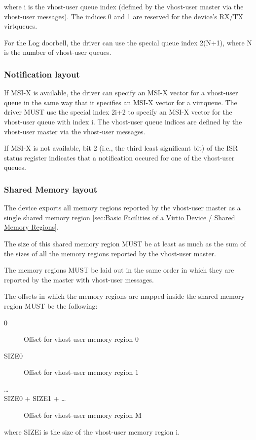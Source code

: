 where i is the vhost-user queue index (defined by the vhost-user master via the
vhost-user messages). The indices 0 and 1 are reserved for the device's RX/TX
virtqueues.

For the Log doorbell, the driver can use the special queue index 2(N+1), where N
is the number of vhost-user queues.

\subsubsection{Notification layout}\label{sec:Device Types / Vhost-user Device Backend / Additional Device Resources / Notification layout}

If MSI-X is available, the driver can specify an MSI-X vector for a vhost-user
queue in the same way that it specifies an MSI-X vector for a virtqueue. The
driver MUST use the special index 2i+2 to specify an MSI-X vector for the
vhost-user queue with index i. The vhost-user queue indices are defined by the
vhost-user master via the vhost-user messages.

If MSI-X is not available, bit 2 (i.e., the third least significant bit) of the
ISR status register indicates that a notification occured for one of the
vhost-user queues.

\subsubsection{Shared Memory layout}\label{sec:Device Types / Vhost-user Device Backend / Additional Device Resources / Shared Memory layout}

The device exports all memory regions reported by the vhost-user master as a
single shared memory region \ref{sec:Basic Facilities of a Virtio Device /
Shared Memory Regions}.

The size of this shared memory region MUST be at least as much as the sum of the
sizes of all the memory regions reported by the vhost-user master.

The memory regions MUST be laid out in the same order in which they are reported
by the master with vhost-user messages.

The offsets in which the memory regions are mapped inside the shared memory
region MUST be the following:

\begin{description}
\item[0] Offset for vhost-user memory region 0
\item[SIZE0] Offset for vhost-user memory region 1
\item[\ldots]
\item[SIZE0 + SIZE1 + \ldots] Offset for vhost-user memory region M
\end{description}

where SIZEi is the size of the vhost-user memory region i.
